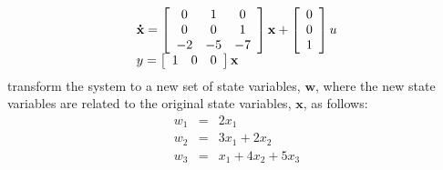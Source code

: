 \[
\begin{array}{l}
 {\bf{\dot x}} = \left[ {\begin{array}{*{20}c}
   0 & 1 & 0  \\
   0 & 0 & 1  \\
   { - 2} & { - 5} & { - 7}  \\
\end{array}} \right]{\bf{x}} + \left[ {\begin{array}{*{20}c}
   0  \\
   0  \\
   1  \\
\end{array}} \right]u \\
 y = \left[ {\begin{array}{*{20}c}
   1 & 0 & 0  \\
\end{array}} \right]{\bf{x}} \\
 \end{array}
\]
transform the system to a new set of state variables, $\mathbf{w}$, where the new state variables are related to the original state variables, $\mathbf{x}$, as follows:
\begin{eqnarray*}
	w_1 & = & 2x_1 \\
	w_2 & = & 3x_1 + 2x_2 \\
	w_3 & = & x_1 + 4x_2 + 5x_3
\end{eqnarray*}
\endinput
